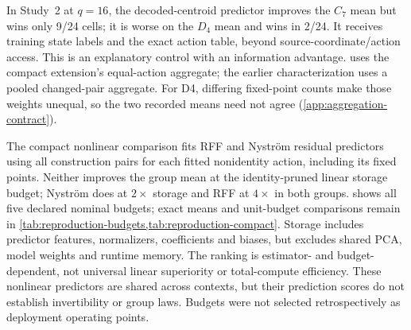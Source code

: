 In Study~2 at $q=16$, the decoded-centroid predictor improves the $C_7$ mean but wins only 9/24 cells; it is worse on the $D_4$ mean and wins in 2/24. It receives training state labels and the exact action table, beyond source-coordinate/action access. This is an explanatory control with an information advantage.  uses the compact extension's equal-action aggregate; the earlier characterization uses a pooled changed-pair aggregate. For D4, differing fixed-point counts make those weights unequal, so the two recorded means need not agree (\cref{app:aggregation-contract}).

The compact nonlinear comparison fits RFF and Nystr\"om residual predictors using all construction pairs for each fitted nonidentity action, including its fixed points. Neither improves the group mean at the identity-pruned linear storage budget; Nystr\"om does at $2\times$ storage and RFF at $4\times$ in both groups.  shows all five declared nominal budgets; exact means and unit-budget comparisons remain in \cref{tab:reproduction-budgets,tab:reproduction-compact}. Storage includes predictor features, normalizers, coefficients and biases, but excludes shared PCA, model weights and runtime memory. The ranking is estimator- and budget-dependent, not universal linear superiority or total-compute efficiency. These nonlinear predictors are shared across contexts, but their prediction scores do not establish invertibility or group laws. Budgets were not selected retrospectively as deployment operating points.

